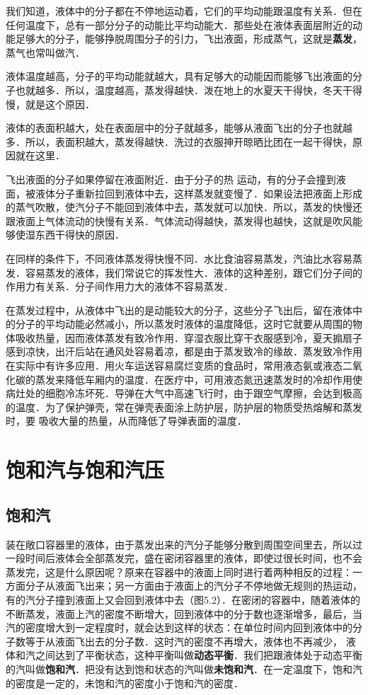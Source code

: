 我们知道，液体中的分子都在不停地运动着，它们的平均动能跟温度有关系．但在任何温度下，总有一部分分子的动能比平均动能大．那些处在液体表面层附近的动能足够大的分子，能够挣脱周围分子的引力，飞出液面，形成蒸气，这就是\textbf{蒸发}，蒸气也常叫做汽．

液体温度越高，分子的平均动能就越大，具有足够大的动能因而能够飞出液面的分子也就越多．所以，温度越高，蒸发得越快．泼在地上的水夏天干得快，冬天干得慢，就是这个原因．

液体的表面积越大，处在表面层中的分子就越多，能够从液面飞出的分子也就越多．所以，表面积越大，蒸发得越快．洗过的衣服抻开晾晒比团在一起干得快，原因就在这里．

飞出液面的分子如果停留在液面附近．由于分子的热
运动，有的分子会撞到液面，被液体分子重新拉回到液体中去，这样蒸发就变慢了．如果设法把液面上形成的蒸气吹散，使汽分子不能回到液体中去，蒸发就可以加快．所以，蒸发的快慢还跟液面上气体流动的快慢有关系．气体流动得越快，蒸发得也越快，这就是吹风能够使湿东西干得快的原因．

在同样的条件下，不同液体蒸发得快慢不同．水比食油容易蒸发，汽油比水容易蒸发．容易蒸发的液体，我们常说它的挥发性大．液体的这种差别，跟它们分子间的作用力有关系．分子间作用力大的液体不容易蒸发．

在蒸发过程中，从液体中飞出的是动能较大的分子，这些分子飞出后，留在液体中的分子的平均动能必然减小，所以蒸发时液体的温度降低，这时它就要从周围的物体吸收热量，因而液体蒸发有致冷作用．穿湿衣服比穿干衣服感到冷，夏天搧扇子感到凉快，出汗后站在通风处容易着凉，都是由于蒸发致冷的缘故．蒸发致冷作用在实际中有许多应用．用火车运送容易腐烂变质的食品时，常用液态氨或液态二氧化碳的蒸发来降低车厢内的温度．在医疗中，可用液态氮迅速蒸发时的冷却作用使病灶处的细胞冷冻坏死．导弹在大气中高速飞行时，由于跟空气摩擦，会达到极高的温度．为了保护弹壳，常在弹壳表面涂上防护层，防护层的物质受热熔解和蒸发时，要
吸收大量的热量，从而降低了导弹表面的温度．

\section{饱和汽与饱和汽压}
\subsection{饱和汽} 
装在敞口容器里的液体，由于蒸发出来的汽分子能够分散到周围空间里去，所以过一段时间后液体会全部蒸发完，盛在密闭容器里的液体，即使过很长时间，也不会蒸发完，这是什么原因呢？原来在容器中的液面上同时进行着两种相反的过程：一方面分子从液面飞出来；另一方面由于液面上的汽分子不停地做无规则的热运动，有的汽分子撞到液面上又会回到液体中去（图5.2）．在密闭的容器中，随着液体的
不断蒸发，液面上汽的密度不断增大，回到液体中的分于数也逐渐增多，最后，当汽的密度增大到一定程度时，就会达到这样的状态：在单位时间内回到液体中的分子数等于从液面飞出去的分子数．这时汽的密度不再增大，液体也不再减少，
液体和汽之间达到了平衡状态，这种平衡叫做\textbf{动态平衡}．我们把跟液体处于动态平衡的汽叫做\textbf{饱和汽}．把没有达到饱和状态的汽叫做\textbf{未饱和汽}．在一定温度下，饱和汽的密度是一定的，未饱和汽的密度小于饱和汽的密度．

